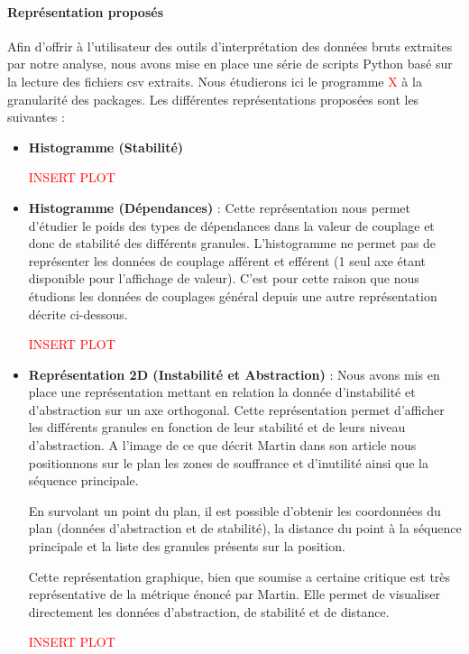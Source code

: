 \documentclass{scrartcl}
\begin{document}
    \paragraph{Représentation proposés}Afin d'offrir à l'utilisateur des outils d'interprétation des données bruts extraites par notre analyse, nous avons mise en place une série de scripts Python basé sur la lecture des fichiers csv extraits. Nous étudierons ici le programme \textcolor{red}{X} à la granularité des packages. Les différentes représentations proposées sont les suivantes :
        \begin{itemize}
        \item \textbf{Histogramme (Stabilité)}
        \begin{center} \textcolor{red}{INSERT PLOT} \end{center}
        \item \textbf{Histogramme (Dépendances)} : Cette représentation nous permet d'étudier le poids des types de dépendances dans la valeur de couplage et donc de stabilité des différents granules. L'histogramme ne permet pas de représenter les données de couplage afférent et efférent (1 seul axe étant disponible pour l'affichage de valeur). C'est pour cette raison que nous étudions les données de couplages général depuis une autre représentation décrite ci-dessous.
        \begin{center} \textcolor{red}{INSERT PLOT} \end{center}
        
        \item \textbf{Représentation 2D (Instabilité et Abstraction)} : Nous avons mis en place une représentation mettant en relation la donnée d'instabilité et d'abstraction sur un axe orthogonal. Cette représentation permet d'afficher les différents granules en fonction de leur stabilité et de leurs niveau d'abstraction. 
        A l'image de ce que décrit Martin dans son article nous positionnons sur le plan les zones de souffrance et d'inutilité ainsi que la séquence principale. 
        
        En survolant un point du plan, il est possible d'obtenir les coordonnées du plan (données d'abstraction et de stabilité), la distance du point à la séquence principale et la liste des granules présents sur la position.
        
        Cette représentation graphique, bien que soumise a certaine critique est très représentative de la métrique énoncé par Martin. Elle permet de visualiser directement les données d'abstraction, de stabilité et de distance.
        \begin{center} \textcolor{red}{INSERT PLOT} \end{center}
        

\end{itemize}
\end{document}

